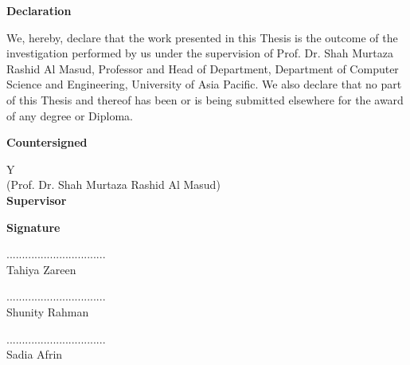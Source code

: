 \newpage
    \begin{center}
    
        \vspace*{-1cm}
        
        \vspace{0.8cm}
        
        \large
        \textbf{Declaration}\\
        \vspace{0.5cm}
        
    \end{center}
\noindent

{We, hereby, declare that the work presented in this Thesis is the outcome of the
investigation performed by us under the supervision of Prof. Dr. Shah Murtaza Rashid Al Masud, Professor and Head of Department, Department of Computer Science and Engineering, University of Asia Pacific. We also declare that no part of this Thesis and thereof has been or is being submitted elsewhere for the award of any degree or Diploma.}

\hspace{1cm}
\textbf{Countersigned}

\vspace{0.5cm}
\begin{table}[h]
\begin{tabular}{Y}
\hrulefill\\
\large (Prof. Dr. Shah Murtaza Rashid Al Masud)\\ \textbf{Supervisor}
\end{tabular}
\end{table}

\hspace{11.9cm}
\textbf{Signature}

\begin{flushright}
................................\\
\large Tahiya Zareen
\end{flushright}


\vspace{0.3cm}
\begin{flushright}
................................\\
\large Shunity Rahman 
\end{flushright}

\vspace{0.3cm}
\begin{flushright}
................................\\
\large Sadia Afrin
\end{flushright}

